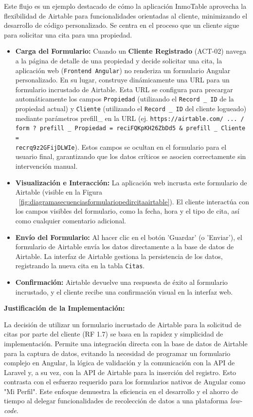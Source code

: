 Este flujo es un ejemplo destacado de cómo la aplicación InmoTable aprovecha la flexibilidad de Airtable para funcionalidades orientadas al cliente, minimizando el desarrollo de código personalizado. Se centra en el proceso que un cliente sigue para solicitar una cita para una propiedad.

\begin{itemize}
    \item \textbf{Carga del Formulario:} Cuando un \textbf{Cliente Registrado} (ACT-02) navega a la página de detalle de una propiedad y decide solicitar una cita, la aplicación web (\texttt{Frontend Angular}) no renderiza un formulario Angular personalizado. En su lugar, construye dinámicamente una URL para un formulario incrustado de Airtable. Esta URL se configura para precargar automáticamente los campos \texttt{Propiedad} (utilizando el \texttt{Record \_ ID} de la propiedad actual) y \texttt{Cliente} (utilizando el \texttt{Record \_ ID} del cliente logueado) mediante parámetros prefill\_ en la URL (ej. \texttt{https://airtable.com/ ... / form ? prefill \_ Propiedad = reciFQKpKH26ZbDd5 \& prefill \_ Cliente =} \\ \texttt{recrq9z2GFijDLWIe}). 
    Estos campos se ocultan en el formulario para el usuario final, garantizando que los datos críticos se asocien correctamente sin intervención manual.

    \item \textbf{Visualización e Interacción:} La aplicación web incrusta este formulario de Airtable (visible en la Figura ~\ref{fig:diagramasecuenciasformulariopedircitaairtable}). El cliente interactúa con los campos visibles del formulario, como la fecha, hora y el tipo de cita, así como cualquier comentario adicional.

    \item \textbf{Envío del Formulario:} Al hacer clic en el botón 'Guardar' (o 'Enviar'), el formulario de Airtable envía los datos directamente a la base de datos de Airtable. La interfaz de Airtable gestiona la persistencia de los datos, registrando la nueva cita en la tabla \texttt{Citas}.

    \item \textbf{Confirmación:} Airtable devuelve una respuesta de éxito al formulario incrustado, y el cliente recibe una confirmación visual en la interfaz web.
\end{itemize}

\textbf{Justificación de la Implementación:}

La decisión de utilizar un formulario incrustado de Airtable para la solicitud de citas por parte del cliente (RF 1.7) se basa en la rapidez y simplicidad de implementación. Permite una integración directa con la base de datos de Airtable para la captura de datos, evitando la necesidad de programar un formulario complejo en Angular, la lógica de validación y la comunicación con la API de Laravel y, a su vez, con la API de Airtable para la inserción del registro. Esto contrasta con el esfuerzo requerido para los formularios nativos de Angular como "Mi Perfil". Este enfoque demuestra la eficiencia en el desarrollo y el ahorro de tiempo al delegar funcionalidades de recolección de datos a una plataforma \textit{low-code}.

